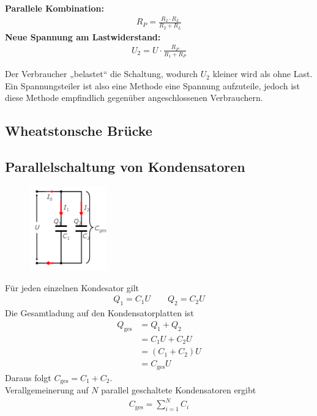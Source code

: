 \documentclass{article}
\begin{document}
\noindent \textbf{Parallele Kombination:}
\begin{align}
    R_P = \frac{R_2 \cdot R_L}{R_2 + R_L}
\end{align}
\textbf{Neue Spannung am Lastwiderstand:}
\begin{align}
    U_2 = U \cdot \frac{R_P}{R_1 + R_P}
\end{align}

\vspace{2em}
\noindent Der Verbraucher „belastet“ die Schaltung, wodurch $U_2$ kleiner wird als ohne Last.\\
Ein Spannungsteiler ist also eine Methode eine Spannung aufzuteile, jedoch ist diese Methode empfindlich gegenüber angeschlossenen Verbrauchern.

\subsection{Wheatstonsche Brücke}


\subsection{Parallelschaltung von Kondensatoren}
\begin{figure}[H]
    \centering
    \includegraphics[width=0.3\textwidth]{Parallelschaltung von Kondensatoren.png}
\end{figure}
Für jeden einzelnen Kondesator gilt
\begin{align}
    Q_1=C_1U\qquad Q_2=C_2U
\end{align}
Die Gesamtladung auf den Kondensatorplatten ist
\begin{align}
    Q_\text{ges}&=Q_1+Q_2\\
    &=C_1U+C_2U\\
    &=(C_1+C_2)U\\
    &=C_\text{ges}U
\end{align}
Daraus folgt $C_\text{ges}=C_1+C_2$.\\
Verallgemeinerung auf $N$ parallel geschaltete Kondensatoren ergibt
\begin{align}
    C_\text{ges}=\sum_{i=1}^{N}C_i
\end{align}
\end{document}
